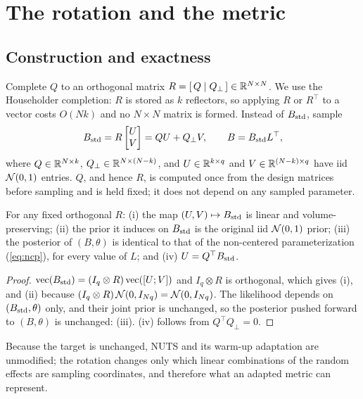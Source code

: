 \section{The rotation and the metric}\label{sec:rotation}

\subsection{Construction and exactness}

Complete $Q$ to an orthogonal matrix $R = [\,Q \mid Q_{\perp}\,] \in
\mathbb{R}^{N \times N}$. We use the Householder completion: $R$ is stored as $k$
reflectors, so applying $R$ or $R^{\top}$ to a vector costs $O(Nk)$ and no
$N \times N$ matrix is formed. Instead of $B_{\mathrm{std}}$, sample
\begin{equation}\label{eq:rot}
B_{\mathrm{std}} = R \begin{bmatrix} U \\ V \end{bmatrix} = Q U + Q_{\perp} V,
\qquad B = B_{\mathrm{std}} L^{\top},
\end{equation}
where $Q \in \mathbb{R}^{N \times k}$, $Q_{\perp} \in \mathbb{R}^{N \times (N-k)}$, and
$U \in \mathbb{R}^{k \times q}$ and $V \in \mathbb{R}^{(N-k) \times q}$ have iid $\mathcal{N}(0,1)$
entries. $Q$, and hence $R$, is computed once from the design matrices
before sampling and is held fixed; it does not depend on any sampled
parameter.

\begin{proposition}[Exactness]\label{prop:exact}
For any fixed orthogonal $R$: (i) the map $(U, V) \mapsto B_{\mathrm{std}}$ is linear
and volume-preserving; (ii) the prior it induces on $B_{\mathrm{std}}$ is the original
iid $\mathcal{N}(0,1)$ prior; (iii) the posterior of $(B, \theta)$ is identical to
that of the non-centered parameterization (\ref{eq:ncp}), for every value of
$L$; and (iv) $U = Q^{\top} B_{\mathrm{std}}$.
\end{proposition}

\begin{proof}
$\operatorname{vec}(B_{\mathrm{std}}) = (I_q \otimes R)\operatorname{vec}([U; V])$
and $I_q \otimes R$ is orthogonal, which gives (i), and (ii) because
$(I_q \otimes R)\,\mathcal{N}(0, I_{Nq}) = \mathcal{N}(0, I_{Nq})$. The likelihood depends
on $(B_{\mathrm{std}}, \theta)$ only, and their joint prior is unchanged, so the
posterior pushed forward to $(B, \theta)$ is unchanged: (iii). (iv)
follows from $Q^{\top} Q_{\perp} = 0$.
\end{proof}

Because the target is unchanged, NUTS and its warm-up adaptation are
unmodified; the rotation changes only which linear combinations of the
random effects are sampling coordinates, and therefore what an adapted
metric can represent.

